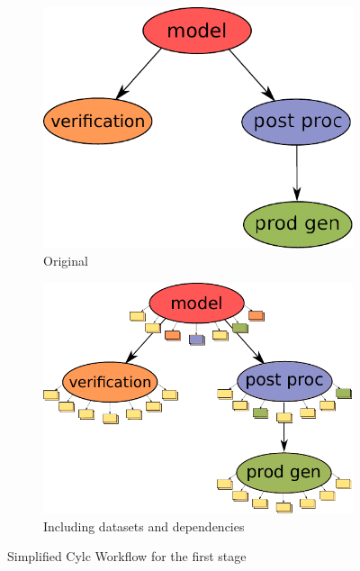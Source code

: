 \documentclass[a4paper]{article}
\begin{document}
\begin{figure}[bt]
  \begin{subfigure}{0.45\textwidth}
    \centering
    \includegraphics[width=\columnwidth]{cycle1}
    \caption{Original}
    \label{fig:cycle1}
  \end{subfigure}
  \qquad
  \begin{subfigure}{0.45\textwidth}
    \centering
    \includegraphics[width=\columnwidth]{cycle-io-dep}
    \caption{Including datasets and dependencies}
    \label{fig:cycle-io-dep}
  \end{subfigure}

  \caption{Simplified Cylc Workflow for the first stage}
\end{figure}
\end{document}
